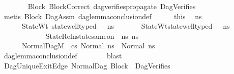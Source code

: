 \begin{isabellebody}
\ \ \ \ \ \ \isamarkupfalse%
\ Block\ BlockCorrect\ dag{\isacharunderscore}{\kern0pt}verifies{\isacharunderscore}{\kern0pt}propagate{\isacharunderscore}{\kern0pt}{}\ DagVerifies\isanewline
\ \ \ \ \ \ \isamarkupfalse%
\ {\isacharparenleft}{\kern0pt}metis\ Block{}\ DagAssm\ dag{\isacharunderscore}{\kern0pt}lemma{\isacharunderscore}{\kern0pt}conclusion{\isacharunderscore}{\kern0pt}def{\isacharparenright}{\kern0pt}\isanewline
\ \ \ \ \isamarkupfalse%
\ this\ \isamarkupfalse%
\ ns{}{\isacharprime}{\kern0pt}\ \isanewline
\ \ \ \ \ \ StateWt{\isacharcolon}{\kern0pt}\ {\isachardoublequoteopen}state{\isacharunderscore}{\kern0pt}well{\isacharunderscore}{\kern0pt}typed\ {\isasymLambda}\ {\isasymOmega}\ ns{}{\isacharprime}{\kern0pt}{\isachardoublequoteclose}\ \isanewline
\ \ \ \ \ \ StateWt{}{\isacharcolon}{\kern0pt}{\isachardoublequoteopen}state{\isacharunderscore}{\kern0pt}well{\isacharunderscore}{\kern0pt}typed\ {\isasymLambda}\ {\isasymOmega}\ ns{}{\isacharprime}{\kern0pt}{\isachardoublequoteclose}\ \isanewline
\ \ \ \ \ \ \isanewline
\ \ \ \ \ \ StateRel{\isacharcolon}{\kern0pt}{\isachardoublequoteopen}nstate{\isacharunderscore}{\kern0pt}same{\isacharunderscore}{\kern0pt}on\ {\isasymLambda}\ ns{}{\isacharprime}{\kern0pt}\ ns{}{\isacharprime}{\kern0pt}\ {\isacharbraceleft}{\kern0pt}{\isacharbraceright}{\kern0pt}{\isachardoublequoteclose}\ \isanewline
\ \ \ \ \ \ NormalDag{\isacharcolon}{\kern0pt}{\isachardoublequoteopen}M{\isacharcomma}{\kern0pt}{\isasymLambda}{\isacharcomma}{\kern0pt}{\isasymGamma}{\isacharcomma}{\kern0pt}{\isasymOmega}\ {\isasymturnstile}\ {\isasymlangle}cs{}{\isacharcomma}{\kern0pt}\ Normal\ ns{}{\isasymrangle}\ {\isacharbrackleft}{\kern0pt}{\isasymrightarrow}{\isacharbrackright}{\kern0pt}\ Normal\ ns{}{\isacharprime}{\kern0pt}{\isachardoublequoteclose}\isanewline
\ \ \ \ \ \ \isamarkupfalse%
\ dag{\isacharunderscore}{\kern0pt}lemma{\isacharunderscore}{\kern0pt}conclusion{\isacharunderscore}{\kern0pt}def\isanewline
\ \ \ \ \ \ \isamarkupfalse%
\ blast\isanewline
\ \ \ \ \isamarkupfalse%
\ DagUniqueExitEdge\ NormalDag\ Block{}\ \ DagVerifies\isanewline
\ \ \ \ \isamarkupfalse%

\end{isabellebody}
